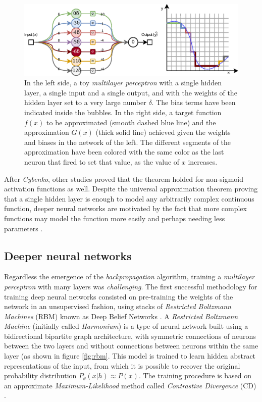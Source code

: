 \begin{figure}
	\centering
	\includegraphics[width=1\linewidth]{chapter2/images/universalapprox}
	\caption{In the left side, a toy \textit{multilayer perceptron} with a single hidden layer, a single input and a single output, and with the weights of the hidden layer set to a very large number $\delta$. The bias terms have been indicated inside the bubbles. In the right side, a target function $f(x)$ to be approximated (smooth dashed blue line) and the approximation $G(x)$ (thick solid line) achieved given the weights and biases in the network of the left. The different segments of the approximation have been colored with the same color as the last neuron that fired to set that value, as the value of $x$ increases.}
	\label{fig:universalapprox}
\end{figure}

After \textit{Cybenko}, other studies \autocite{Leshno1993, pinkus1999} proved that the theorem holded for non-sigmoid activation functions as well. Despite the universal approximation theorem proving that a single hidden layer is enough to model any arbitrarily complex continuous function, deeper neural networks are motivated by the fact that more complex functions may model the function more easily and perhaps needing less parameters \autocite{nguyen21}.



\subsection{Deeper neural networks}
Regardless the emergence of the \textit{backpropagation} algorithm, training a \textit{multilayer perceptron} with many layers was \textit{challenging}. The first successful methodology for training deep neural networks consisted on pre-training the weights of the network in an unsupervised fashion, using stacks of \textit{Restricted Boltzmann Machines} (RBM) \autocite{Smolensky1986} known as Deep Belief Networks \autocite{hinton2006, Bengio2007}. A \textit{Restricted Boltzmann Machine} (initially called \textit{Harmonium}) is a type of neural network built using a bidirectional bipartite graph architecture, with symmetric connections of neurons between the two layers and without connections between neurons within the same layer (as shown in figure \ref{fig:rbm}. This model is trained to learn hidden abstract representations of the input, from which it is possible to recover the original probability distribution $P_\theta(x|h) \approx P(x)$. The training procedure is based on an approximate \textit{Maximum-Likelihood} method called \textit{Contrastive Divergence} (CD) \autocite{hinton2002}.

